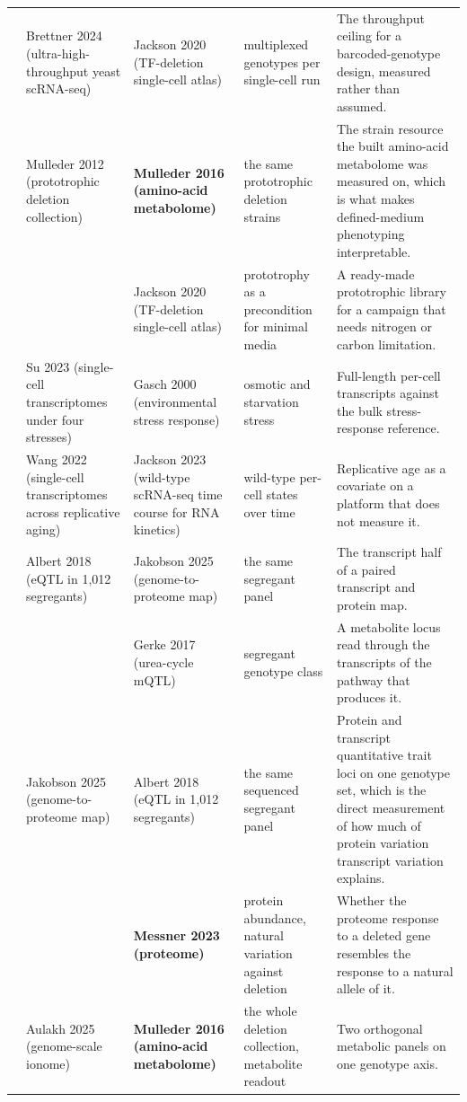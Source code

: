\begin{landscape}
\begin{longtable}{@{}r@{\hspace{4pt}} L{42mm} L{44mm} L{48mm} L{96mm}@{}}
 & Brettner 2024 (ultra-high-throughput yeast scRNA-seq) & Jackson 2020 (TF-deletion single-cell atlas) & multiplexed genotypes per single-cell run & The throughput ceiling for a barcoded-genotype design, measured rather than assumed. \\
 & Mulleder 2012 (prototrophic deletion collection) & \textbf{Mulleder 2016 (amino-acid metabolome)} & the same prototrophic deletion strains & The strain resource the built amino-acid metabolome was measured on, which is what makes defined-medium phenotyping interpretable. \\
 &  & Jackson 2020 (TF-deletion single-cell atlas) & prototrophy as a precondition for minimal media & A ready-made prototrophic library for a campaign that needs nitrogen or carbon limitation. \\
 & Su 2023 (single-cell transcriptomes under four stresses) & Gasch 2000 (environmental stress response) & osmotic and starvation stress & Full-length per-cell transcripts against the bulk stress-response reference. \\
 & Wang 2022 (single-cell transcriptomes across replicative aging) & Jackson 2023 (wild-type scRNA-seq time course for RNA kinetics) & wild-type per-cell states over time & Replicative age as a covariate on a platform that does not measure it. \\
 & Albert 2018 (eQTL in 1,012 segregants) & Jakobson 2025 (genome-to-proteome map) & the same segregant panel & The transcript half of a paired transcript and protein map. \\
 &  & Gerke 2017 (urea-cycle mQTL) & segregant genotype class & A metabolite locus read through the transcripts of the pathway that produces it. \\
 & Jakobson 2025 (genome-to-proteome map) & Albert 2018 (eQTL in 1,012 segregants) & the same sequenced segregant panel & Protein and transcript quantitative trait loci on one genotype set, which is the direct measurement of how much of protein variation transcript variation explains. \\
 &  & \textbf{Messner 2023 (proteome)} & protein abundance, natural variation against deletion & Whether the proteome response to a deleted gene resembles the response to a natural allele of it. \\
 & Aulakh 2025 (genome-scale ionome) & \textbf{Mulleder 2016 (amino-acid metabolome)} & the whole deletion collection, metabolite readout & Two orthogonal metabolic panels on one genotype axis. \\

\end{longtable}
\end{landscape}
